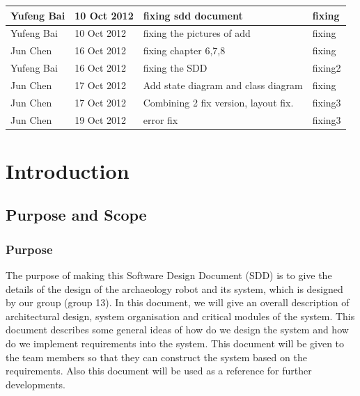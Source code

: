 \documentclass[11pt, a4paper]{report}
\begin{document}
\begin{tabular}{| l | l | l | l | }
Yufeng Bai	&	10 Oct 2012	&	fixing sdd document				&	fixing	\\ \hline
Yufeng Bai	&	10 Oct 2012	& fixing the pictures of add	&	fixing \\ \hline
Jun Chen     		&16 Oct 2012        	&	fixing chapter 6,7,8                  	  	&	fixing   	\\ \hline
Yufeng Bai	&	16 Oct 2012		& fixing the SDD			&	fixing2 \\ \hline
Jun Chen    		&	17 Oct 2012     	&	Add state diagram and class diagram                  	  	&	fixing     	\\ \hline
Jun Chen    		&	17 Oct 2012       	&	Combining 2 fix version, layout fix.               	  	&	fixing3   	\\ \hline
Jun Chen    		&	 19 Oct 2012     	&	error fix                  	  	&	fixing3   	\\ \hline
%





\end{tabular}
\clearpage


\chapter{Introduction}%
\label{cha:I}


\section{Purpose and Scope}
\subsection{Purpose}
The purpose of making this Software Design Document (SDD) is to give the details of the design of the archaeology robot and its system, which is designed by our group (group 13). In this document, we will give an overall description of architectural design, system organisation and critical modules of the system. This document describes some general ideas of how do we design the system and how do we implement requirements into the system. This document will be given to the team members so that they can construct the system based on the requirements. Also this document will be used as a reference for further developments.
\end{document}
